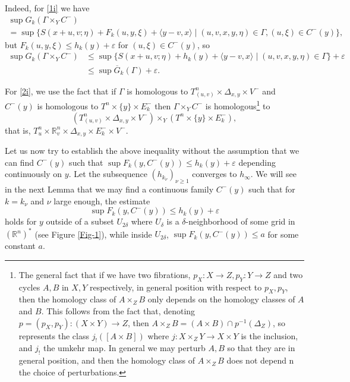 \documentclass[JEP,XML,SOM,NoFloatCountersInSection,Unicode,published]{cedram}
\numberwithin{equation}{section}
\theoremstyle{plain}
\theoremstyle{definition}
\theoremstyle{remark}
\begin{document}
Indeed, for \eqref{1i} we have
\begin{multline*}
\sup G_k (\Gamma\times_YC^-)\\
=\sup \{S(x+u,v;\eta)+F_k(u,y,\xi)+ \langle y-v,x\rangle \mid (u,v,x,y,\eta)\in \Gamma, (u,\xi)\in C^-(y)\},
\end{multline*}
but $F_k(u,y,\xi)\leq h_k(y)+ \varepsilon $ for $(u,\xi)\in C^-(y)$, so
\begin{align*}
\sup G_k (\Gamma\times_YC^-) &\leq \sup \{S(x+u,v;\eta)+h_k(y)+ \langle y-v,x\rangle \mid (u,v,x,y,\eta)\in \Gamma\}+ \varepsilon\\
&\leq \sup \overline G_k(\Gamma)+
\varepsilon.
\end{align*}

For \eqref{2i}, we use the fact that if $\Gamma$ is homologous to $T^{n}_{(u,v)}\times \Delta_{x,y} \times V^{-}$ and $C^-(y)$ is homologous to
$T^{n} \times \{y\}\times E^{-}_{k}$ then $\Gamma\times_YC^-$ is homologous\footnote{The general fact that if we have two fibrations, $p_X:X \to Z, p_Y: Y \to Z$ and two cycles $A,B$ in $X,Y$ respectively, in general position with respect to $p_X, p_Y$, then the homology class of $A\times_ZB$ only depends on the homology classes of $A$ and $B$. This follows from the fact that, denoting $p=(p_X,p_Y):(X\times Y) \to Z$, then $A\times_ZB=(A\times B)\cap p^{-1}(\Delta_Z)$, so represents the class $j_! ([A\times B])$ where $j: X\times_ZY \to X \times Y$ is the inclusion, and $j_{!}$ the umkehr map. In general we may perturb $A,B$ so that they are in general position, and then the homology class of $A\times_ZB$ does not depend n the choice of perturbations.}
to
\[
(T^{n}_{(u,v)}\times \Delta_{x,y} \times V^{-})\times_Y(T^{n} \times \{y\}\times E^{-}_{k}),
\]
that is, $T^{n}_{u}\times {\mathbb R}_{v}^{n}\times \Delta_{x,y} \times E^{-}_{k} \times V^{-}$.


Let us now try to establish the above inequality without the assumption that we can find $C^{-}(y)$ such that $\sup F_k(y, C^-(y)) \leq h_k(y)+ \varepsilon $ depending continuously on $y$. Let the subsequence $(h_{k_{\nu}})_{\nu\geq 1}$ converges to $h_{\infty}$. We will see in the next Lemma that we may find a continuous family $C^{-}(y)$ such that for $k=k_{\nu}$ and $\nu$ large enough, the estimate\vspace*{-3pt}
\[
\sup
{F}_{k} (y, C^-(y))\leq {h}_{k}(y) +\varepsilon
\]
holds for $y$ outside of a subset $U_{2\delta}$ where $U_{\delta}$ is a $\delta$-neighborhood of some grid in
$(\mathbb{R}^{n})^{*}$ (see Figure \ref{Fig-1}), while inside $U_{2\delta}$, $\sup {F}_{k}(y,C^-(y))\leq a$ for some
constant $a$.
\end{document}
